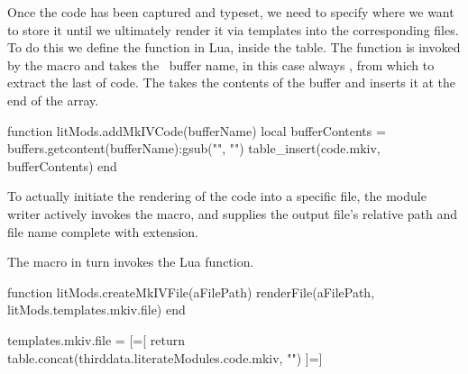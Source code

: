 \let\oldStopMkIVAltCode=\stopMkIVAltCode
\def\stopMkIVAltCode{%
  \oldStopMkIVAltCode%
  \directlua{thirddata.literateModules.addMkIVCode('_typing_')}}

\stopMkIVCode

 Once the  code has been captured and typeset, we need to 
specify where we want to store it until we ultimately render it via 
templates into the corresponding  files. To do this we define 
the  function in Lua, inside the  table. 
The  function is invoked by the \type{\stopMkIVCode} 
macro and takes the \ConTeXt\ buffer name, in this case always 
, from which to extract the last  of 
 code. The  takes the contents of the buffer 
and inserts it at the end of the  array. 

\startLuaCode
function litMods.addMkIVCode(bufferName)
  local bufferContents = buffers.getcontent(bufferName):gsub("", "\n")
  table_insert(code.mkiv, bufferContents)
end
\stopLuaCode

 
To actually initiate the rendering of the  code into a specific 
file, the module writer actively invokes the \type{\createMkIVFile} macro, 
and supplies the output file's relative path and file name complete with 
extension. 

\startMkIVCode


\def\createMkIVFile[#1]{
  \directlua{thirddata.literateModules.createMkIVFile('#1')}
}

\stopMkIVCode

The \type{\createMkIVFile} macro in turn invokes the  
Lua function. 

\startLuaCode
function litMods.createMkIVFile(aFilePath)
  renderFile(aFilePath, litMods.templates.mkiv.file)
end
\stopLuaCode

\startLuaTemplate

templates.mkiv.file = [=[
{{ return table.concat(thirddata.literateModules.code.mkiv, "\n\n") }}
]=]

\stopLuaTemplate

\stopchapter